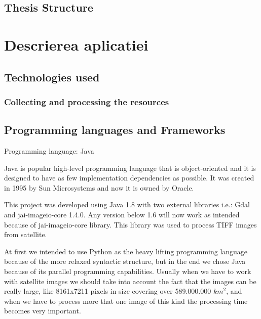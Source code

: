 \documentclass[12pt, a4paper]{report}
\begin{document}
\section{Thesis Structure}



\newpage{}


\chapter{Descrierea aplicatiei}

\section{Technologies used}

\subsection{Collecting and processing the resources}


\section{Programming languages and Frameworks} 

{\Large Programming language: Java\par}
\medskip


Java is popular high-level programming language that is object-oriented and it is designed to have as few implementation dependencies as possible. It was created in 1995 by Sun Microsystems and now it is owned by Oracle.
\par

This project was developed using Java 1.8 with two external libraries i.e.: Gdal and jai-imageio-core 1.4.0. Any version below 1.6 will now work as intended because of jai-imageio-core library. This library was used to process TIFF images from satellite.
\par

At first we intended to use Python as the heavy lifting programming language because of the more relaxed syntactic structure, but in the end we chose Java because of its parallel programming capabilities. Usually when we have to work with satellite images we should take into account the fact that the images can be really large, like 8161x7211 pixels in size covering over 589.000.000 $km^2$, and when we have to process more that one image of this kind the processing time becomes very important.
\par
\end{document}
